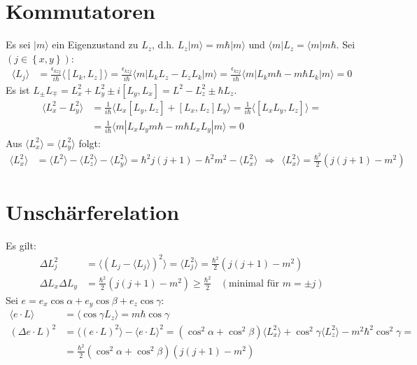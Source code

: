 \documentclass[a4paper,12pt]{article}
\newcommand{\bra}{}
\newcommand{\braket}{}
\newcommand{\kla}{}
\newcommand{\klammer}{}
\begin{document}
\section{Kommutatoren}
Es sei $|m\rangle$ ein Eigenzustand zu $L_z$, d.h. $L_z|m\rangle = m\hbar |m\rangle$ und $\langle m|L_z=\langle m|m\hbar$. Sei $(j\in\klammer\left\{ {x,y} \right\})$:
\begin{align*}
\bra\langle {L_j}\rangle &=\frac{\epsilon_{kzj}}{i\hbar}\langle \left[ {L_k,L_z} \right]\rangle=\frac{\epsilon_{kzj}}{i\hbar}\braket\langle {m} | {L_kL_z-L_zL_k} | {m}\rangle=\frac{\epsilon_{kzj}}{i\hbar}\braket\langle {m} | {L_k m\hbar - m\hbar L_k} | {m}\rangle=0
\end{align*}
Es ist $L_\pm L_\mp=L_x^2+L_y^2\pm i[L_y,L_x]=L^2-L_z^2\pm\hbar L_z$.
\begin{align*}
\bra\langle {L_x^2-L_y^2}\rangle&=\frac{1}{i\hbar}\bra\langle {L_x[L_y,L_z]+[L_x,L_z]L_y}\rangle=\frac{1}{i\hbar}\bra\langle {[L_xL_y,L_z]}\rangle=\\
&=\frac{1}{i\hbar}\braket\langle {m} | {L_xL_ym\hbar-m\hbar L_xL_y} | {m}\rangle=0
\end{align*}
Aus $\bra\langle {L_x^2}\rangle=\bra\langle {L_y^2}\rangle$ folgt:
\begin{align*}
\bra\langle {L_x^2}\rangle&=\bra\langle {L^2}\rangle-\bra\langle {L_z^2}\rangle-\bra\langle {L_y^2}\rangle=\hbar^2j(j+1)-\hbar^2m^2-\bra\langle {L_x^2}\rangle\ \ \Rightarrow\ \ \bra\langle {L_x^2}\rangle=\frac{\hbar^2}{2}\kla\left( {j(j+1)-m^2} \right)
\end{align*} 
\section{Unschärferelation}
Es gilt:
\begin{align*}
\Delta L_j^2&=\bra\langle {(L_j-\bra\langle {L_j}\rangle)^2}\rangle=\bra\langle {L_j^2}\rangle=\frac{\hbar^2}{2}\kla\left( {j(j+1)-m^2} \right)\\
\Delta L_x\Delta L_y&=\frac{\hbar^2}{2}\kla\left( {j(j+1)-m^2} \right)\ge\frac{\hbar^2}{2}\ \ \ \ (\text{minimal für }m=\pm j)
\end{align*}
Sei $e=e_x\cos\alpha +e_y\cos\beta +e_z\cos\gamma$:
\begin{align*}
\bra\langle {e\cdot L}\rangle&=\bra\langle \cos\gamma L_z\rangle=m\hbar\cos\gamma \\
(\Delta e\cdot L)^2&=\bra\langle {(e\cdot L)^2}\rangle-\bra\langle {e\cdot L}\rangle^2=(\cos^2\alpha+\cos^2\beta)\bra\langle {L_x^2}\rangle+\cos^2\gamma\bra\langle {L_z^2}\rangle-m^2\hbar^2\cos^2\gamma= \\
&=\frac{\hbar^2}{2}(\cos^2\alpha+\cos^2\beta)\kla\left( {j(j+1)-m^2} \right)
\end{align*}
\end{document}
